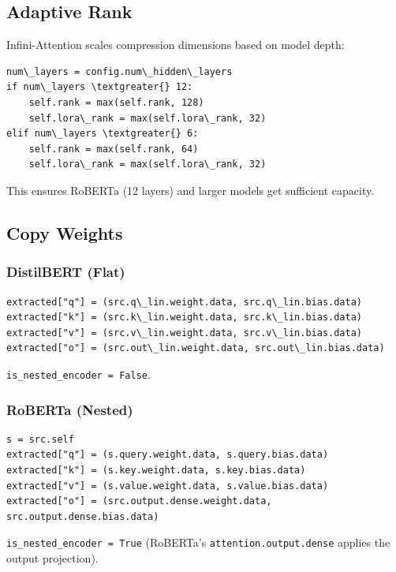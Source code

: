 \subsection{Adaptive Rank}

Infini-Attention scales compression dimensions based on model depth:

\begin{lstlisting}
num\_layers = config.num\_hidden\_layers
if num\_layers \textgreater{} 12:
    self.rank = max(self.rank, 128)
    self.lora\_rank = max(self.lora\_rank, 32)
elif num\_layers \textgreater{} 6:
    self.rank = max(self.rank, 64)
    self.lora\_rank = max(self.lora\_rank, 32)
\end{lstlisting}

This ensures RoBERTa (12 layers) and larger models get sufficient 
capacity.

\subsection{Copy Weights}

\subsubsection{DistilBERT (Flat)}

\begin{lstlisting}
extracted["q"] = (src.q\_lin.weight.data, src.q\_lin.bias.data)
extracted["k"] = (src.k\_lin.weight.data, src.k\_lin.bias.data)
extracted["v"] = (src.v\_lin.weight.data, src.v\_lin.bias.data)
extracted["o"] = (src.out\_lin.weight.data, src.out\_lin.bias.data)
\end{lstlisting}

\texttt{is\_nested\_encoder = False}.

\subsubsection{RoBERTa (Nested)}

\begin{lstlisting}
s = src.self
extracted["q"] = (s.query.weight.data, s.query.bias.data)
extracted["k"] = (s.key.weight.data, s.key.bias.data)
extracted["v"] = (s.value.weight.data, s.value.bias.data)
extracted["o"] = (src.output.dense.weight.data, src.output.dense.bias.data)
\end{lstlisting}

\texttt{is\_nested\_encoder = True} (RoBERTa's \texttt{attention.output.dense} applies the 
output projection).

